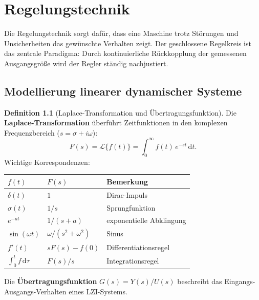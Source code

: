 ﻿\documentclass[a4paper,12pt]{report}
\theoremstyle{definition}
\newtheorem{definition}{Definition}
\begin{document}
\chapter{Regelungstechnik}

Die Regelungstechnik sorgt daf\"ur, dass eine Maschine trotz
St\"orungen und Unsicherheiten das gew\"unschte Verhalten zeigt.
Der geschlossene Regelkreis ist das zentrale Paradigma: Durch
kontinuierliche R\"uckkopplung der gemessenen Ausgangsgr\"o\ss{}e
wird der Regler st\"andig nachjustiert.

\section{Modellierung linearer dynamischer Systeme}

\begin{definition}[Laplace-Transformation und \"Ubertragungsfunktion]
Die \textbf{Laplace-Transformation} \"uberf\"uhrt Zeitfunktionen in
den komplexen Frequenzbereich ($s = \sigma + i\omega$):
\[
  F(s) = \mathcal{L}\{f(t)\} = \int_0^\infty f(t)\,e^{-st}\,\mathrm{d}t.
\]
Wichtige Korrespondenzen:
\begin{center}
\begin{tabular}{lll}
\toprule
$f(t)$ & $F(s)$ & Bemerkung \\
\midrule
$\delta(t)$ & $1$ & Dirac-Impuls \\
$\sigma(t)$ & $1/s$ & Sprungfunktion \\
$e^{-at}$ & $1/(s+a)$ & exponentielle Abklingung \\
$\sin(\omega t)$ & $\omega/(s^2+\omega^2)$ & Sinus \\
$f'(t)$ & $sF(s) - f(0)$ & Differentiationsregel \\
$\int_0^t f\,\mathrm{d}\tau$ & $F(s)/s$ & Integrationsregel \\
\bottomrule
\end{tabular}
\end{center}
Die \textbf{\"Ubertragungsfunktion} $G(s) = Y(s)/U(s)$ beschreibt
das Eingangs-Ausgangs-Verhalten eines LZI-Systems.
\end{definition}
\end{document}
